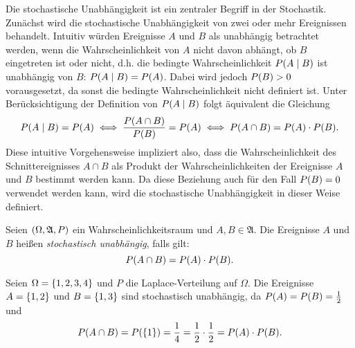 \documentclass{lecture}
\begin{document}
    Die stochastische Unabhängigkeit ist ein zentraler Begriff in der Stochastik.
    Zunächst wird die stochastische Unabhängigkeit von zwei oder mehr Ereignissen behandelt.
    Intuitiv würden Ereignisse \(A\) und \(B\) als unabhängig betrachtet werden, wenn die Wahrscheinlichkeit von \(A\) nicht davon abhängt, ob \(B\) eingetreten ist oder nicht, d.h. die bedingte Wahrscheinlichkeit \(P\parentheses*{A \mid B}\) ist unabhängig von \(B\): \(P\parentheses*{A \mid B} = P\parentheses*{A}\).
    Dabei wird jedoch \(P\parentheses*{B} > 0\) vorausgesetzt, da sonst die bedingte Wahrscheinlichkeit nicht definiert ist.
    Unter Berücksichtigung der Definition von \(P\parentheses*{A \mid B}\) folgt äquivalent die Gleichung
    \[
        P\parentheses*{A \mid B} = P\parentheses*{A} \iff \frac{P\parentheses*{A \cap B}}{P\parentheses*{B}} = P\parentheses*{A} \iff P\parentheses*{A \cap B} = P\parentheses*{A} \cdot P\parentheses*{B}.
    \]
    Diese intuitive Vorgehensweise impliziert also, dass die Wahrscheinlichkeit des Schnittereignisses \(A \cap B\) als Produkt der Wahrscheinlichkeiten der Ereignisse \(A\) und \(B\) bestimmt werden kann.
    Da diese Beziehung auch für den Fall \(P\parentheses*{B} = 0\) verwendet werden kann, wird die stochastische Unabhängigkeit in dieser Weise definiert.

    \begin{definition}
        Seien \(\parentheses*{\Omega, \mathfrak{A}, P}\) ein Wahrscheinlichkeitsraum und \(A, B \in \mathfrak{A}\).
        Die Ereignisse \(A\) und \(B\) heißen \emph{stochastisch unabhängig}, falls gilt:
        \[
            P\parentheses*{A \cap B} = P\parentheses*{A} \cdot P\parentheses*{B}.
        \]
    \end{definition}

    \begin{example}
        Seien \(\Omega = \braces*{1, 2, 3, 4}\) und \(P\) die Laplace-Verteilung auf \(\Omega\).
        Die Ereignisse \(A = \braces*{1, 2}\) und \(B = \braces*{1, 3}\) sind stochastisch unabhängig, da \(P\parentheses*{A} = P\parentheses*{B} = \frac{1}{2}\) und
        \[
            P\parentheses*{A \cap B} = P\parentheses*{\braces*{1}} = \frac{1}{4} = \frac{1}{2} \cdot \frac{1}{2} = P\parentheses*{A} \cdot P\parentheses*{B}.
        \]
    \end{example}
\end{document}
